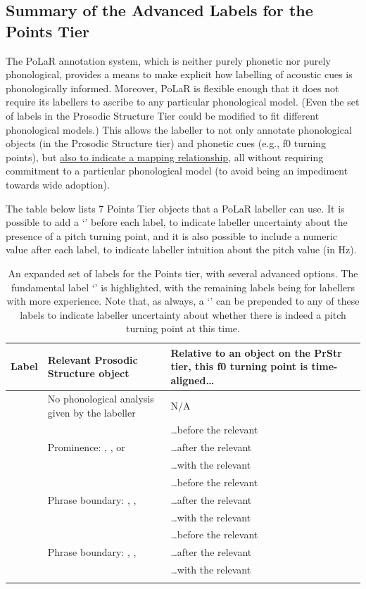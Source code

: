 \documentclass[11pt, twoside]{memoir}
\def\textlabel#1{{\relsize{-.5}\fontspec[Mapping=tex-text]{Roboto Mono}{#1}}}
\begin{document}
\subsection{Summary of the Advanced Labels for the Points Tier}\label{sec:summary-of-the-points-tier}

The PoLaR annotation system, which is neither purely phonetic nor purely phonological, provides a means to make explicit how labelling of acoustic cues is phonologically informed. Moreover, PoLaR is flexible enough that it does not require its labellers to ascribe to any particular phonological model. (Even the set of labels in the Prosodic Structure Tier could be modified to fit different phonological models.) This allows the labeller to not only annotate phonological objects (in the Prosodic Structure tier) and phonetic cues (e.g., f0 turning points), but \uline{also to indicate a mapping relationship}, all without requiring commitment to a particular phonological model (to avoid being an impediment towards wide adoption).

The table below lists 7 Points Tier objects that a PoLaR labeller can use. It is possible to add a ‘\textlabel{?}’ before each label, to indicate labeller uncertainty about the presence of a pitch turning point, and it is also possible to include a numeric value after each label, to indicate labeller intuition about the pitch value (in Hz).

\begin{longtable}{c>{\centering}p{.33\linewidth}>{\centering\arraybackslash}p{.45\linewidth}} \toprule \textbf{Label} & \textbf{Relevant Prosodic Structure object} & \textbf{Relative to an object on the PrStr tier, this f0 turning point is time-aligned…}\tabularnewline
\midrule \endhead
\rowcolor{green}\textlabel{0} & No phonological analysis given by the labeller & N/A\tabularnewline
\midrule
\textlabel{*>} & & …before the relevant \textlabel{*}\tabularnewline
\textlabel{*<} & Prominence: \textlabel{*}, \textlabel{?*}, or \textlabel{**} & …after the relevant \textlabel{*}\tabularnewline
\textlabel{*@} & & …with the relevant \textlabel{*}\tabularnewline
\midrule
\textlabel{]>} & & …before the relevant \textlabel{]}\tabularnewline
\textlabel{]<} & Phrase boundary: \textlabel{]}, \textlabel{?]}, \textlabel{]]} & …after the relevant \textlabel{]}\tabularnewline
\textlabel{]@} & & …with the relevant \textlabel{]}\tabularnewline
\midrule
\textlabel{[>} & & …before the relevant \textlabel{[}\tabularnewline
\textlabel{[<} & Phrase boundary: \textlabel{[}, \textlabel{?[}, \textlabel{[[} & …after the relevant \textlabel{[}\tabularnewline
\textlabel{[@} & & …with the relevant \textlabel{[}\tabularnewline
\bottomrule
\caption[An expanded set of labels for the Points tier, with several advanced options.]{An expanded set of labels for the Points tier, with several advanced options. The fundamental label ‘\textlabel{0}’ is highlighted, with the remaining labels being for labellers with more experience. Note that, as always, a ‘\textlabel{?}’ can be prepended to any of these labels to indicate labeller uncertainty about whether there is indeed a pitch turning point at this time.}
\end{longtable}
\end{document}
